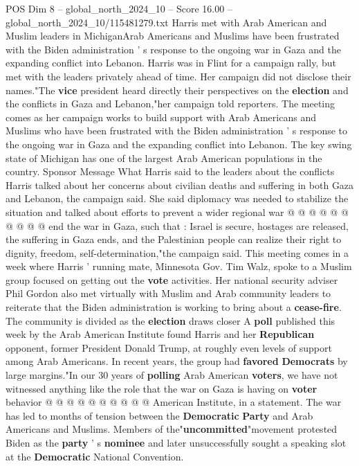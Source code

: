 \begin{textsample}{POS Dim 8 – global\_north\_2024\_10 – Score 16.00 – global\_north\_2024\_10/115481279.txt}  \label{ex:f8_pos_160}
Harris met with Arab American and Muslim leaders in MichiganArab Americans and Muslims have been frustrated with the Biden administration ' s response to the ongoing war in Gaza and the expanding conflict into Lebanon.
Harris was in Flint for a campaign rally, but met with the leaders privately ahead of time.
Her campaign did not disclose their names."The \textbf{vice} president heard directly their perspectives on the \textbf{election} and the conflicts in Gaza and Lebanon,"her campaign told reporters.
The meeting comes as her campaign works to build support with Arab Americans and Muslims who have been frustrated with the Biden administration ' s response to the ongoing war in Gaza and the expanding conflict into Lebanon.
The key swing state of Michigan has one of the largest Arab American populations in the country.
Sponsor Message What Harris said to the leaders about the conflicts Harris talked about her concerns about civilian deaths and suffering in both Gaza and Lebanon, the campaign said.
She said diplomacy was needed to stabilize the situation and talked about efforts to prevent a wider regional war @ @ @ @ @ @ @ @ @ @ end the war in Gaza, such that : Israel is secure, hostages are released, the suffering in Gaza ends, and the Palestinian people can realize their right to dignity, freedom, self-determination,"the campaign said.
This meeting comes in a week where Harris ' running mate, Minnesota Gov.
Tim Walz, spoke to a Muslim group focused on getting out the \textbf{vote} activities.
Her national security adviser Phil Gordon also met virtually with Muslim and Arab community leaders to reiterate that the Biden administration is working to bring about a \textbf{cease-fire}.
The community is divided as the \textbf{election} draws closer A \textbf{poll} published this week by the Arab American Institute found Harris and her \textbf{Republican} opponent, former President Donald Trump, at roughly even levels of support among Arab Americans.
In recent years, the group had \textbf{favored} \textbf{Democrats} by large margins."In our 30 years of \textbf{polling} Arab American \textbf{voters}, we have not witnessed anything like the role that the war on Gaza is having on \textbf{voter} behavior @ @ @ @ @ @ @ @ @ @ American Institute, in a statement.
The war has led to months of tension between the \textbf{Democratic} \textbf{Party} and Arab Americans and Muslims.
Members of the"\textbf{uncommitted}"movement protested Biden as the \textbf{party} ' s \textbf{nominee} and later unsuccessfully sought a speaking slot at the \textbf{Democratic} National Convention.

\end{textsample}
